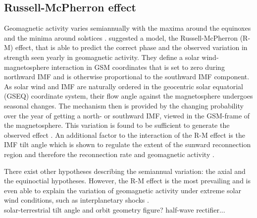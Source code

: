 \subsection{Russell-McPherron effect}
\label{sec:russell_mcpherron_effect}
Geomagnetic activity varies semiannually with the maxima around the equinoxes and the minima around solstices \citep{Cortie1912}. \citet{Russell1973} suggested a model, the Russell-McPherron (R-M) effect, that is able to predict the correct phase and the observed variation in strength seen yearly in geomagnetic activity. They define a solar wind-magnetosphere interaction in GSM coordinates that is set to zero during northward IMF and is otherwise proportional to the southward IMF component. As solar wind and IMF are naturally ordered in the geocentric solar equatorial (GSEQ) coordinate system, their flow angle against the magnetosphere undergoes seasonal changes. The mechanism then is provided by the changing probability over the year of getting a north- or southward IMF, viewed in the GSM-frame of the magnetosphere. This variation is found to be sufficient to generate the observed effect \citep{Russell1973}. An additional factor to the interaction of the R-M effect is the IMF tilt angle which is shown to regulate the extent of the sunward reconnection region and therefore the reconnection rate and geomagnetic activity \citep{Russell2003}.

There exist other hypotheses describing the semiannual variation: the axial and the equinoctial hypotheses. However, the R-M effect is the most prevailing and is even able to explain the variation of geomagnetic activity under extreme solar wind conditions, such as interplanetary shocks \citep{Zhao2012}.\\

solar-terrestrial tilt angle and orbit geometry figure? half-wave rectifier...\\


